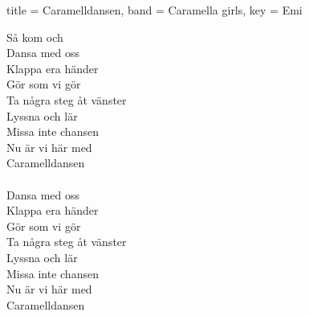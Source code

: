 \begin{song}[
	remember-chords = false ,
	verse/numbered = true ,
	transpose-capo = true 
	]{
		title = Caramelldansen,
		band = Caramella girls,
		key  = Emi
	}
\begin{chorus}
		Så kom och \\
		Dansa med oss \\
		Klappa era händer \\
		Gör som vi gör \\
		Ta några steg åt vänster \\
		Lyssna och lär \\
		Missa inte chansen \\
		Nu är vi här med \\
		Caramelldansen \\
		\\
		Dansa med oss \\
		Klappa era händer \\
		Gör som vi gör \\
		Ta några steg åt vänster \\
		Lyssna och lär \\
		Missa inte chansen \\
		Nu är vi här med \\
		Caramelldansen \\
		
	\end{chorus}
\end{song}